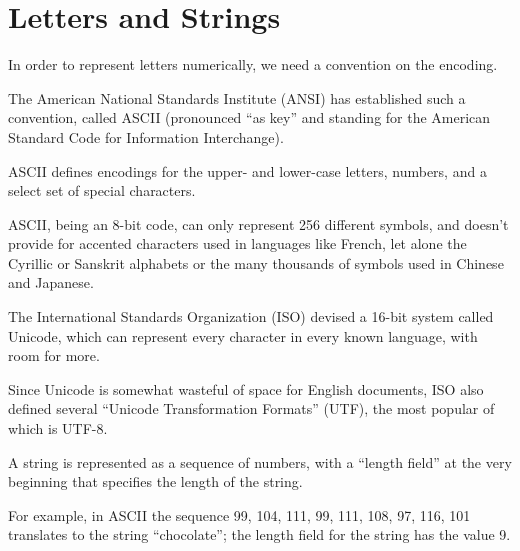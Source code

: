 \documentclass[8pt,a4paper,compress,handout]{beamer}
\begin{document}
\section{Letters and Strings}
\begin{frame}[fragile]
In order to represent letters numerically, we need a convention on the encoding. 

\bigskip

The American National Standards Institute (ANSI) has established such a convention, called ASCII (pronounced ``as key'' and standing for the American Standard Code for Information Interchange). 

\bigskip

ASCII defines encodings for the upper- and lower-case letters, numbers, and a select set of special characters.

\bigskip

ASCII, being an 8-bit code, can only represent 256 different symbols, and doesn't provide for accented characters used in languages like French, let alone the Cyrillic or Sanskrit alphabets or the many thousands of symbols used in Chinese and Japanese.

\bigskip

The International Standards Organization (ISO) devised a 16-bit system called Unicode, which can represent every character in every known language, with room for more. 

\bigskip

Since Unicode is somewhat wasteful of space for English documents, ISO also defined several ``Unicode Transformation Formats'' (UTF), the most popular of which is UTF-8. 
\end{frame}

\begin{frame}[fragile]
A string is represented as a sequence of numbers, with a ``length field'' at the very beginning that specifies the length of the string. 

\bigskip

For example, in ASCII the sequence 99, 104, 111, 99, 111, 108, 97, 116, 101 translates to the string ``chocolate''; the length field for the string has the value 9.
\end{frame}
\end{document}
